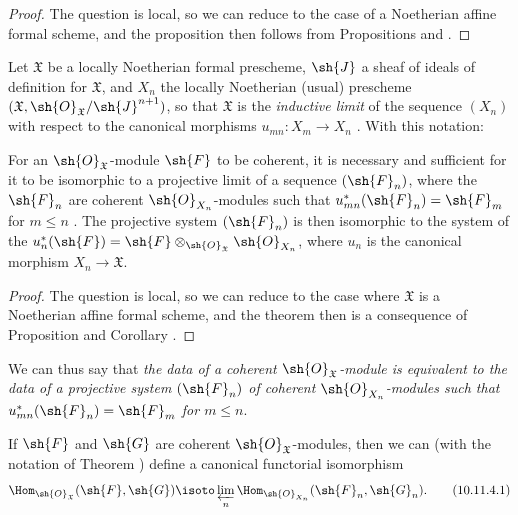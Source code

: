 \begin{proof}
The question is local, so we can reduce to the case of a Noetherian affine formal scheme, and the proposition then follows from Propositions  and .
\end{proof}

\begin{env}[10.11.2]
\label{I.10.11.2}
Let $\mathfrak{X}$ be a locally Noetherian formal prescheme, $\sh{J}$ a sheaf of ideals of definition for $\mathfrak{X}$, and $X_n$ the locally Noetherian (usual) prescheme $(\mathfrak{X},\sh{O}_\mathfrak{X}/\sh{J}^{n+1})$, so that $\mathfrak{X}$ is the \emph{inductive limit} of the sequence $(X_n)$ with respect to the canonical morphisms $u_{mn}:X_m\to X_n$ .
With this notation:
\end{env}

\begin{theorem}[10.11.3]
\label{I.10.11.3}
For an $\sh{O}_\mathfrak{X}$-module $\sh{F}$ to be coherent, it is necessary and sufficient for it to be isomorphic to a projective limit of a sequence $(\sh{F}_n)$, where the $\sh{F}_n$ are coherent $\sh{O}_{X_n}$-modules such that $u_{mn}^*(\sh{F}_n)=\sh{F}_m$ for $m\leq n$ .
The projective system $(\sh{F}_n)$ is then isomorphic to the system of the $u_n^*(\sh{F})=\sh{F}\otimes_{\sh{O}_\mathfrak{X}}\sh{O}_{X_n}$, where $u_n$ is the canonical morphism $X_n\to\mathfrak{X}$.
\end{theorem}

\begin{proof}
The question is local, so we can reduce to the case where $\mathfrak{X}$ is a Noetherian affine formal scheme, and the theorem then is a consequence of Proposition  and Corollary .
\end{proof}

We can thus say that \emph{the data of a coherent $\sh{O}_\mathfrak{X}$-module is equivalent to the data of a projective system $(\sh{F}_n)$ of coherent $\sh{O}_{X_n}$-modules such that $u_{mn}^*(\sh{F}_n)=\sh{F}_m$ for $m\leq n$}.

\begin{corollary}[10.11.4]
\label{I.10.11.4}
If $\sh{F}$ and $\sh{G}$ are coherent $\sh{O}_\mathfrak{X}$-modules, then we can (with the notation of Theorem ) define a canonical functorial isomorphism
\[
\label{I.10.11.4.1}
  \Hom_{\sh{O}_\mathfrak{X}}(\sh{F},\sh{G})\isoto\varprojlim_n\Hom_{\sh{O}_{X_n}}(\sh{F}_n,\sh{G}_n).
  \tag{10.11.4.1}
\]
\end{corollary}

